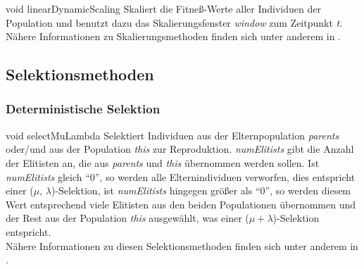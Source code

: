 \documentclass{report}
\begin{document}
\setNormalInstance
\setCorrectWidthThree{8pt}
\printMethodWithParamsSaved
{void}
{}
{linearDynamicScaling}
{Skaliert die Fitne{\ss}-Werte aller Individuen der Population und benutzt
 dazu das Skalierungsfenster {\em window} zum Zeitpunkt {\em t}.\\
 N\"ahere Informationen zu Skalierungsmethoden finden sich unter anderem
 in \cite{Goldberg}.}
{}
\setCorrectWidthThree{4pt}

\subsection{Selektionsmethoden}

\subsubsection{Deterministische Selektion}

\setNormalInstance
\setCorrectWidthThree{8pt}
\printMethodWithParamsSaved
{void}
{}
{selectMuLambda}
{Selektiert Individuen aus der Elternpopulation {\em parents} oder/und aus
 der Population {\em this} zur Reproduktion.
 {\em numElitists} gibt die Anzahl der Elitisten an, die aus {\em parents}
 und {\em this} \"ubernommen werden sollen. Ist {\em numElitists} gleich 
 ``0'', so werden alle Elternindividuen verworfen, dies entspricht einer
 ($\mu$, $\lambda$)-Selektion, ist
 {\em numElitists} hingegen gr\"o{\ss}er als ``0'', so werden diesem Wert 
 entsprechend viele Elitisten aus den beiden Populationen \"ubernommen und 
 der Rest aus der Population {\em this} ausgew\"ahlt, was einer 
 ($\mu + \lambda$)-Selektion entspricht.\\
 N\"ahere Informationen zu diesen Selektionsmethoden finden sich unter
 anderem in \cite{Baeck}.}
{}
\setCorrectWidthThree{4pt}
\end{document}

